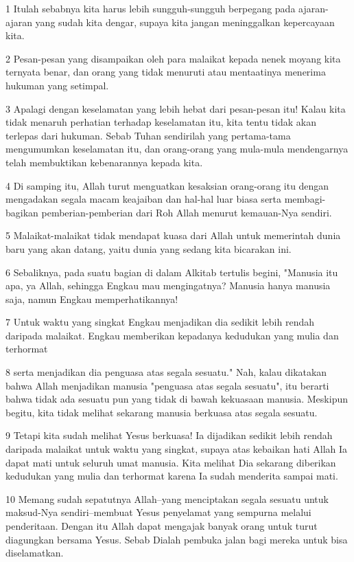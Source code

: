 \par 1 Itulah sebabnya kita harus lebih sungguh-sungguh berpegang pada ajaran-ajaran yang sudah kita dengar, supaya kita jangan meninggalkan kepercayaan kita.
\par 2 Pesan-pesan yang disampaikan oleh para malaikat kepada nenek moyang kita ternyata benar, dan orang yang tidak menuruti atau mentaatinya menerima hukuman yang setimpal.
\par 3 Apalagi dengan keselamatan yang lebih hebat dari pesan-pesan itu! Kalau kita tidak menaruh perhatian terhadap keselamatan itu, kita tentu tidak akan terlepas dari hukuman. Sebab Tuhan sendirilah yang pertama-tama mengumumkan keselamatan itu, dan orang-orang yang mula-mula mendengarnya telah membuktikan kebenarannya kepada kita.
\par 4 Di samping itu, Allah turut menguatkan kesaksian orang-orang itu dengan mengadakan segala macam keajaiban dan hal-hal luar biasa serta membagi-bagikan pemberian-pemberian dari Roh Allah menurut kemauan-Nya sendiri.
\par 5 Malaikat-malaikat tidak mendapat kuasa dari Allah untuk memerintah dunia baru yang akan datang, yaitu dunia yang sedang kita bicarakan ini.
\par 6 Sebaliknya, pada suatu bagian di dalam Alkitab tertulis begini, "Manusia itu apa, ya Allah, sehingga Engkau mau mengingatnya? Manusia hanya manusia saja, namun Engkau memperhatikannya!
\par 7 Untuk waktu yang singkat Engkau menjadikan dia sedikit lebih rendah daripada malaikat. Engkau memberikan kepadanya kedudukan yang mulia dan terhormat
\par 8 serta menjadikan dia penguasa atas segala sesuatu." Nah, kalau dikatakan bahwa Allah menjadikan manusia "penguasa atas segala sesuatu", itu berarti bahwa tidak ada sesuatu pun yang tidak di bawah kekuasaan manusia. Meskipun begitu, kita tidak melihat sekarang manusia berkuasa atas segala sesuatu.
\par 9 Tetapi kita sudah melihat Yesus berkuasa! Ia dijadikan sedikit lebih rendah daripada malaikat untuk waktu yang singkat, supaya atas kebaikan hati Allah Ia dapat mati untuk seluruh umat manusia. Kita melihat Dia sekarang diberikan kedudukan yang mulia dan terhormat karena Ia sudah menderita sampai mati.
\par 10 Memang sudah sepatutnya Allah--yang menciptakan segala sesuatu untuk maksud-Nya sendiri--membuat Yesus penyelamat yang sempurna melalui penderitaan. Dengan itu Allah dapat mengajak banyak orang untuk turut diagungkan bersama Yesus. Sebab Dialah pembuka jalan bagi mereka untuk bisa diselamatkan.
